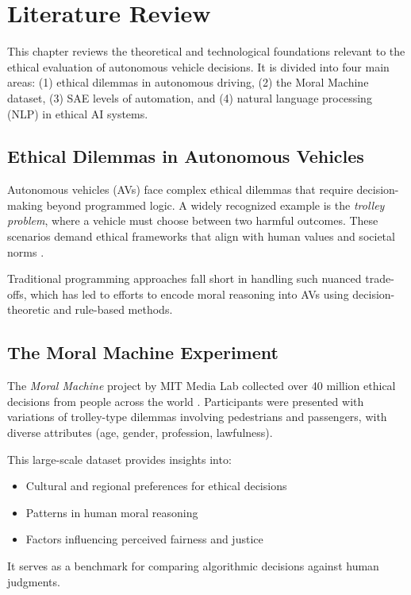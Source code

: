 \chapter{Literature Review}

This chapter reviews the theoretical and technological foundations relevant to the ethical evaluation of autonomous vehicle decisions. It is divided into four main areas: (1) ethical dilemmas in autonomous driving, (2) the Moral Machine dataset, (3) SAE levels of automation, and (4) natural language processing (NLP) in ethical AI systems.

\section{Ethical Dilemmas in Autonomous Vehicles}

Autonomous vehicles (AVs) face complex ethical dilemmas that require decision-making beyond programmed logic. A widely recognized example is the \textit{trolley problem}, where a vehicle must choose between two harmful outcomes. These scenarios demand ethical frameworks that align with human values and societal norms \cite{goodall2014ethics, lin2016ethics}.

Traditional programming approaches fall short in handling such nuanced trade-offs, which has led to efforts to encode moral reasoning into AVs using decision-theoretic and rule-based methods.

\section{The Moral Machine Experiment}

The \textit{Moral Machine} project by MIT Media Lab collected over 40 million ethical decisions from people across the world \cite{awad2018moral}. Participants were presented with variations of trolley-type dilemmas involving pedestrians and passengers, with diverse attributes (age, gender, profession, lawfulness).

This large-scale dataset provides insights into:
\begin{itemize}
    \item Cultural and regional preferences for ethical decisions
    \item Patterns in human moral reasoning
    \item Factors influencing perceived fairness and justice
\end{itemize}

It serves as a benchmark for comparing algorithmic decisions against human judgments.


